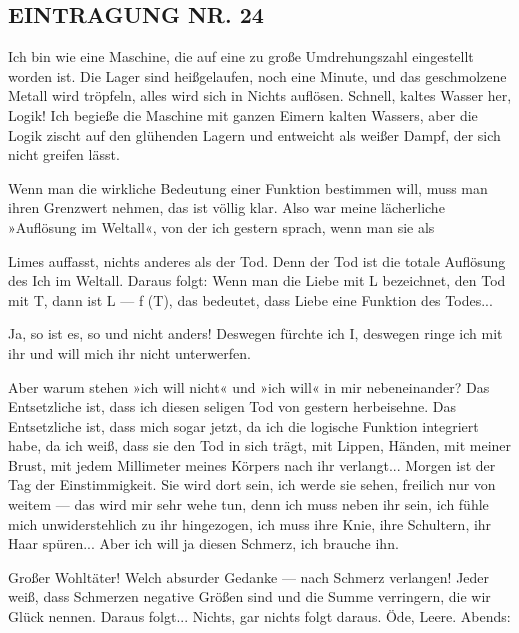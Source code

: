 \subsection{EINTRAGUNG NR. 24}

Ich bin wie eine Maschine, die auf eine zu große Umdrehungszahl
eingestellt worden ist. Die Lager sind heißgelaufen, noch eine
Minute, und das geschmolzene Metall wird tröpfeln, alles wird sich
in Nichts auflösen. Schnell, kaltes Wasser her, Logik! Ich begieße
die Maschine mit ganzen Eimern kalten Wassers, aber die Logik
zischt auf den glühenden Lagern und entweicht als weißer Dampf, der
sich nicht greifen lässt.

Wenn man die wirkliche Bedeutung einer Funktion bestimmen will,
muss man ihren Grenzwert nehmen, das ist völlig klar. Also war
meine lächerliche »Auflösung im Weltall«, von der ich gestern
sprach, wenn man sie als

Limes auffasst, nichts anderes als der Tod. Denn der Tod ist die
totale Auflösung des Ich im Weltall. Daraus folgt: Wenn man die
Liebe mit L bezeichnet, den Tod mit T, dann ist L — f (T), das
bedeutet, dass Liebe eine Funktion des Todes...

Ja, so ist es, so und nicht anders! Deswegen fürchte ich I,
deswegen ringe ich mit ihr und will mich ihr nicht unterwerfen.

Aber warum stehen »ich will nicht« und »ich will« in mir
nebeneinander? Das Entsetzliche ist, dass ich diesen seligen Tod
von gestern herbeisehne. Das Entsetzliche ist, dass mich sogar
jetzt, da ich die logische Funktion integriert habe, da ich weiß,
dass sie den Tod in sich trägt, mit Lippen, Händen, mit meiner
Brust, mit jedem Millimeter meines Körpers nach ihr verlangt...
Morgen ist der Tag der Einstimmigkeit. Sie wird dort sein, ich
werde sie sehen, freilich nur von weitem — das wird mir sehr wehe
tun, denn ich muss neben ihr sein, ich fühle mich unwiderstehlich
zu ihr hingezogen, ich muss ihre Knie, ihre Schultern, ihr Haar
spüren... Aber ich will ja diesen Schmerz, ich brauche ihn.

Großer Wohltäter! Welch absurder Gedanke — nach Schmerz verlangen!
Jeder weiß, dass Schmerzen negative Größen sind und die Summe
verringern, die wir Glück nennen. Daraus folgt... Nichts, gar
nichts folgt daraus. Öde, Leere. Abends:

